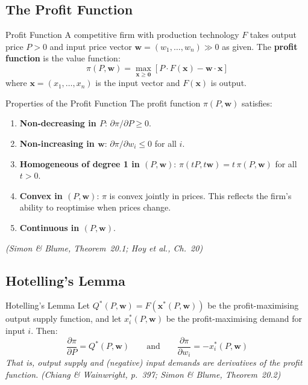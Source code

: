 \documentclass[12pt, a4paper]{article}
\theoremstyle{definition}
\newcommand{\bz}{\mathbf{0}}
\newcommand{\pp}[2]{\dfrac{\partial #1}{\partial #2}}
\begin{document}
\subsection{The Profit Function}

\begin{defbox}{Profit Function}
A competitive firm with production technology $F$ takes output price $P>0$
and input price vector $\mathbf{w} = (w_1,\ldots,w_n) \gg 0$ as given.
The \textbf{profit function} is the value function:
\[
  \pi(P,\mathbf{w})
  = \max_{\mathbf{x}\geq\bz}\left[P\cdot F(\mathbf{x})
    - \mathbf{w}\cdot\mathbf{x}\right]
\]
where $\mathbf{x}=(x_1,\ldots,x_n)$ is the input vector and
$F(\mathbf{x})$ is output.
\end{defbox}

\begin{thmbox}{Properties of the Profit Function}
The profit function $\pi(P,\mathbf{w})$ satisfies:
\begin{enumerate}
  \item \textbf{Non-decreasing in $P$}: $\partial\pi/\partial P \geq 0$.
  \item \textbf{Non-increasing in $\mathbf{w}$}:
        $\partial\pi/\partial w_i \leq 0$ for all $i$.
  \item \textbf{Homogeneous of degree 1 in $(P,\mathbf{w})$}:
        $\pi(tP,t\mathbf{w}) = t\,\pi(P,\mathbf{w})$ for all $t>0$.
  \item \textbf{Convex in $(P,\mathbf{w})$}:
        $\pi$ is convex jointly in prices. This reflects the firm's ability
        to reoptimise when prices change.
  \item \textbf{Continuous in $(P,\mathbf{w})$}.
\end{enumerate}
\emph{(Simon \& Blume, Theorem~20.1; Hoy et al., Ch.\ 20)}
\end{thmbox}

\subsection{Hotelling's Lemma}

\begin{thmbox}{Hotelling's Lemma}
Let $Q^*(P,\mathbf{w}) = F(\mathbf{x}^*(P,\mathbf{w}))$ be the
profit-maximising output supply function, and let $x_i^*(P,\mathbf{w})$
be the profit-maximising demand for input $i$. Then:
\[
  \pp{\pi}{P} = Q^*(P,\mathbf{w})
  \qquad\text{and}\qquad
  \pp{\pi}{w_i} = -x_i^*(P,\mathbf{w})
\]
\emph{That is, output supply and (negative) input demands are derivatives of
the profit function.}
\emph{(Chiang \& Wainwright, p.\ 397; Simon \& Blume, Theorem~20.2)}
\end{thmbox}
\end{document}
